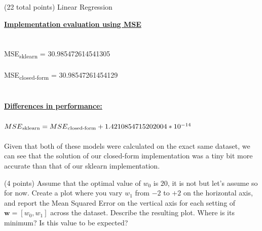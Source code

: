 \documentclass[12pt]{article}
\begin{document}
\begin{question}{(22 total points) Linear Regression}
\begin{subquestion}
\begin{answerbox}{20em}
\large{\textbf{\underline{Implementation evaluation using MSE}}}\\
\\
\\
\normalsize{
MSE\textsubscript{sklearn} = 30.985472614541305\\
\\
MSE\textsubscript{closed-form} = 30.98547261454129\\
\\
\\
\textbf{\underline{Differences in performance:}}\\
\\
$MSE\textsubscript{sklearn} = MSE\textsubscript{closed-form}   +   1.4210854715202004 * 10^{-14}$\\
\\
Given that both of these models were calculated on the exact same dataset, we can see that the solution of our closed-form implementation was a tiny bit more accurate than that of our sklearn implementation.
}
\end{answerbox}



\end{subquestion}




%
%
\begin{subquestion}{(4 points) Assume that the optimal value of $w_0$ is $20$, it is not but let's assume so for now. 
Create a plot where you vary $w_1$ from $-2$ to $+2$ on the horizontal axis, and report the Mean Squared Error on the vertical axis for each setting of $\mathbf{w} = [w_0, w_1]$ across the dataset. 
Describe the resulting plot. Where is its minimum? Is this value to be expected?\\ 
}



\end{subquestion}
\end{question}
\end{document}
